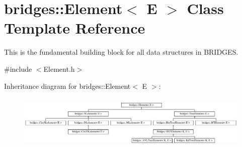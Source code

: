 \hypertarget{classbridges_1_1_element}{}\section{bridges\+:\+:Element$<$ E $>$ Class Template Reference}
\label{classbridges_1_1_element}


This is the fundamental building block for all data structures in B\+R\+I\+D\+G\+E\+S.  




{\ttfamily \#include $<$Element.\+h$>$}

Inheritance diagram for bridges\+:\+:Element$<$ E $>$\+:\begin{figure}[H]
\begin{center}
\leavevmode
\includegraphics[height=2.641510cm]{classbridges_1_1_element}
\end{center}
\end{figure}
